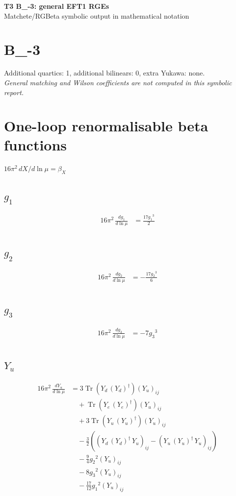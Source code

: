 \documentclass[10pt,a4paper]{article}
\begin{document}
\begin{center}
{\Large\bfseries T3 B\_-3: general EFT1 RGEs}\\[4pt]
Matchete/RGBeta symbolic output in mathematical notation
\end{center}
\bigskip
\section*{B\_-3}
Additional quartics: 1, additional bilinears: 0, extra Yukawa: none.\\
\emph{General matching and Wilson coefficients are not computed in this symbolic report.}
\clearpage
\section*{One-loop renormalisable beta functions}
$16\pi^2\,dX/d\ln\mu=\beta_X$
\subsection*{$g_1$}
\begin{align*}
16\pi^2\,\frac{d g_1}{d\ln\mu} &=\frac{17 {g_1}^3}{2} \\
\end{align*}
\subsection*{$g_2$}
\begin{align*}
16\pi^2\,\frac{d g_2}{d\ln\mu} &=-\frac{17 {g_2}^3}{6} \\
\end{align*}
\subsection*{$g_3$}
\begin{align*}
16\pi^2\,\frac{d g_3}{d\ln\mu} &=-7 {g_3}^3 \\
\end{align*}
\subsection*{$Y_u$}
\begin{align*}
16\pi^2\,\frac{d Y_u}{d\ln\mu} &=3 \operatorname{Tr}\!\left({Y_d}\,\left({Y_d}\right)^{\dagger}\right) \left({Y_u}\right)_{ij} \\
&\quad +\operatorname{Tr}\!\left({Y_e}\,\left({Y_e}\right)^{\dagger}\right) \left({Y_u}\right)_{ij} \\
&\quad +3 \operatorname{Tr}\!\left({Y_u}\,\left({Y_u}\right)^{\dagger}\right) \left({Y_u}\right)_{ij} \\
&\quad -\frac{3}{2} (\left({Y_d}\,\left({Y_d}\right)^{\dagger}\,{Y_u}\right)_{ij}-\left({Y_u}\,\left({Y_u}\right)^{\dagger}\,{Y_u}\right)_{ij}) \\
&\quad -\frac{9}{4} {g_2}^2 \left({Y_u}\right)_{ij} \\
&\quad -8 {g_3}^2 \left({Y_u}\right)_{ij} \\
&\quad -\frac{17}{12} {g_1}^2 \left({Y_u}\right)_{ij} \\
\end{align*}
\end{document}
